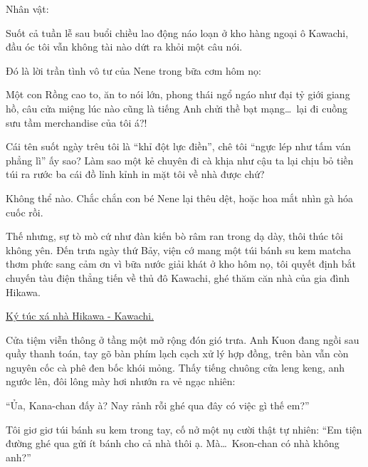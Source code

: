 \documentclass[../main.tex]{subfiles}
\begin{document}
\begin{center}
  {\caviar\fontsize{12pt}{12pt}\selectfont Nhân vật:   }
\end{center}



Suốt cả tuần lễ sau buổi chiều lao động náo loạn ở kho hàng ngoại ô Kawachi, đầu óc tôi vẫn không tài nào dứt ra khỏi một câu nói.

Đó là lời trần tình vô tư của Nene trong bữa cơm hôm nọ:


Một con Rồng cao to, ăn to nói lớn, phong thái ngổ ngáo như đại tỷ giới giang hồ, câu cửa miệng lúc nào cũng là tiếng Anh chửi thề bạt mạng\dots\ lại đi cuồng sưu tầm merchandise của tôi á?!

Cái tên suốt ngày trêu tôi là ``khỉ đột lực điền'', chê tôi ``ngực lép như tấm ván phẳng lì'' ấy sao? Làm sao một kẻ chuyên đi cà khịa như cậu ta lại chịu bỏ tiền túi ra rước ba cái đồ lỉnh kỉnh in mặt tôi về nhà được chứ?

Không thể nào. Chắc chắn con bé Nene lại thêu dệt, hoặc hoa mắt nhìn gà hóa cuốc rồi.

Thế nhưng, sự tò mò cứ như đàn kiến bò râm ran trong dạ dày, thôi thúc tôi không yên. Đến trưa ngày thứ Bảy, viện cớ mang một túi bánh su kem matcha thơm phức sang cảm ơn vì bữa nước giải khát ở kho hôm nọ, tôi quyết định bắt chuyến tàu điện thẳng tiến về thủ đô Kawachi, ghé thăm căn nhà của gia đình Hikawa.

\ct

\begin{center}
  \uline{Ký túc xá nhà Hikawa - Kawachi.}
\end{center}

Cửa tiệm viễn thông ở tầng một mở rộng đón gió trưa. Anh Kuon đang ngồi sau quầy thanh toán, tay gõ bàn phím lạch cạch xử lý hợp đồng, trên bàn vẫn còn nguyên cốc cà phê đen bốc khói mỏng. Thấy tiếng chuông cửa leng keng, anh ngước lên, đôi lông mày hơi nhướn ra vẻ ngạc nhiên:

``Ủa, Kana-chan đấy à? Nay rảnh rỗi ghé qua đây có việc gì thế em?''

Tôi giơ giơ túi bánh su kem trong tay, cố nở một nụ cười thật tự nhiên: ``Em tiện đường ghé qua gửi ít bánh cho cả nhà thôi ạ. Mà\dots\ Kson-chan có nhà không anh?''
\end{document}
